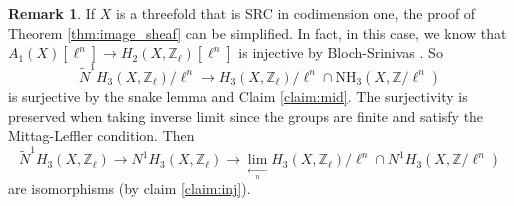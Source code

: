 \documentclass{amsart}
\theoremstyle{definition}
\newtheorem{rem}[theorem]{Remark}
\theoremstyle{remark}
\newcommand{\mbb}{\mathbb}
\newcommand{\ZZ}{\mbb{Z}}
\begin{document}
\begin{rem}
    If $X$ is a threefold that is SRC in codimension one, the proof of Theorem \ref{thm:image_sheaf} can be simplified. In fact, in this case, we know that $A_1(X)[\ell^n] \to H_2(X, \ZZ_\ell)[\ell^n]$ is injective by Bloch-Srinivas \cite[Theorem 1, (ii)]{BlochSrinivas}. So 
    \begin{equation*}
\tilde{N}^{1}H_3(X, \ZZ_\ell)/\ell^n \to  H_3(X, \ZZ_\ell)/\ell^n \cap \text{NH}_3(X, \ZZ/\ell^n)  
\end{equation*}
 is surjective by the snake lemma and Claim \ref{claim:mid}. The surjectivity is preserved when taking inverse limit since the groups are finite and satisfy the Mittag-Leffler condition. Then
    \begin{equation*}
\tilde{N}^{1}H_3(X, \ZZ_\ell) \to N^{1}H_3(X, \ZZ_\ell) \to \lim \limits_{\xleftarrow[n]{}} H_3(X, \ZZ_\ell)/\ell^n \cap N^1H_3(X, \ZZ/\ell^n)  
\end{equation*}
are isomorphisms (by claim \ref{claim:inj}).
\end{rem}
\end{document}
